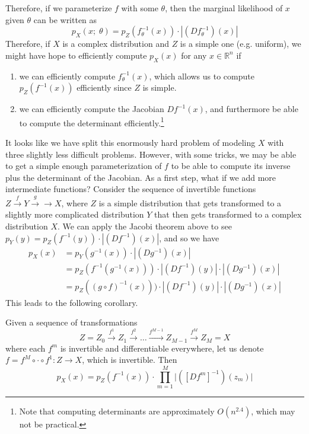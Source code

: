   Therefore, if we parameterize $f$ with some $\theta$, then the marginal likelihood of $x$ given $\theta$ can be written as 
  \begin{equation}
    p_X (x;\; \theta) = p_Z (f^{-1}_\theta (x)) \cdot | (D f^{-1}_\theta) (x) |
  \end{equation} 
  Therefore, if $X$ is a complex distribution and $Z$ is a simple one (e.g. uniform), we might have hope to efficiently compute $p_X (x)$ for any $x \in \mathbb{R}^n$ if 
  \begin{enumerate}
    \item we can efficiently compute $f^{-1}_\theta (x)$, which allows us to compute $p_Z (f^{-1} (x))$ efficiently since $Z$ is simple. 
    \item we can efficiently compute the Jacobian $Df^{-1} (x)$, and furthermore be able to compute the determinant efficiently.\footnote{Note that computing determinants are approximately $O(n^{2.4})$, which may not be practical. } 
  \end{enumerate} 
  It looks like we have split this enormously hard problem of modeling $X$ with three slightly less difficult problems. However, with some tricks, we may be able to get a simple enough parameterization of $f$ to be able to compute its inverse plus the determinant of the Jacobian. As a first step, what if we add more intermediate functions? Consider the sequence of invertible functions $Z \xrightarrow{f} Y \xrightarrow{g} \rightarrow X$, where $Z$ is a simple distribution that gets transformed to a slightly more complicated distribution $Y$ that then gets transformed to a complex distribution $X$. We can apply the Jacobi theorem above to see $p_Y (y) = p_Z (f^{-1} (y)) \cdot | (Df^{-1})(x)|$, and so we have 
  \begin{align}
    p_X (x) & = p_Y (g^{-1} (x)) \cdot | (D g^{-1}) (x) | \\
            & = p_Z (f^{-1} (g^{-1} (x))) \cdot | (Df^{-1}) (y)| \cdot | (D g^{-1}) (x) | \\ 
            & = p_Z ((g \circ f)^{-1} (x))) \cdot | (Df^{-1}) (y)| \cdot | (D g^{-1}) (x) | 
  \end{align}
  This leads to the following corollary. 

  \begin{corollary}[Jacobi]
    Given a sequence of transformations 
    \begin{equation}
      Z = Z_0 \xrightarrow{f^1} Z_1 \xrightarrow{f^2} \ldots \xrightarrow{f^{M-1}} Z_{M-1} \xrightarrow{f^M} Z_M = X
    \end{equation} 
    where each $f^m$ is invertible and differentiable everywhere, let us denote $f = f^M \circ \cdot \circ f^1: Z \rightarrow X$, which is invertible. Then
    \begin{equation}
      p_X (x) = p_Z (f^{-1} (x)) \cdot \prod_{m=1}^M \big|([D f^m]^{-1})(z_m) \big|
    \end{equation}
  \end{corollary} 

